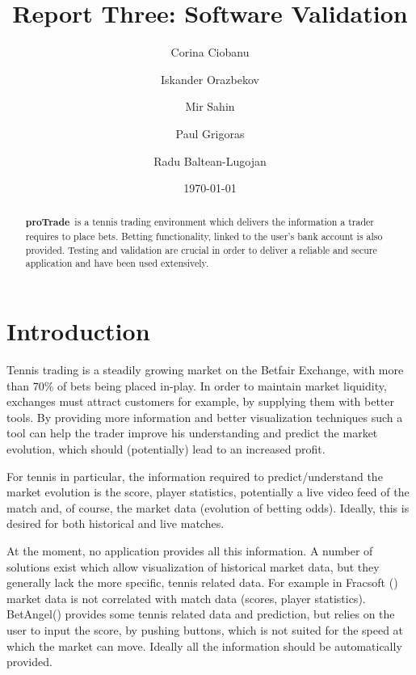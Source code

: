 \documentclass[10pt]{article}
\newcommand{\nm}{{\bf proTrade}}
\newcommand{\nmsp}{{\nm \ }}
\begin{document}
\title{Report Three: Software Validation}

\author{Corina Ciobanu \and Iskander Orazbekov \and Mir Sahin \and Paul Grigoras \and Radu Baltean-Lugojan}

\date{\today}         %

\maketitle            %

\begin{abstract}
  \nmsp is a tennis trading environment which delivers the information a trader requires to place bets. Betting functionality, linked to the user's bank account is also provided. Testing and validation are crucial in order to deliver a reliable and secure application and have been used extensively.
\end{abstract}

\tableofcontents

\section{Introduction}
Tennis trading is a steadily growing market on the Betfair Exchange, with more than 70\% of bets being placed in-play. In order to maintain market liquidity, exchanges must attract customers for example, by supplying them with better tools. By providing more information and better visualization techniques such a tool can help the trader improve his understanding and predict the market evolution, which should (potentially) lead to an increased profit.

For tennis in particular, the information required to predict/understand the market evolution is the score, player statistics, potentially a live video feed of the match and, of course, the market data (evolution of betting odds). Ideally, this is desired for both historical and live matches.

At the moment, no application provides all this information. A number of solutions exist which allow visualization of historical market data, but they generally lack the more specific, tennis related data. For example in Fracsoft () market data is not correlated with match data (scores, player statistics). BetAngel() provides some tennis related data and prediction, but relies on the user to input the score, by pushing buttons, which is not suited for the speed at which the market can move. Ideally all the information should be automatically provided.
\end{document}
